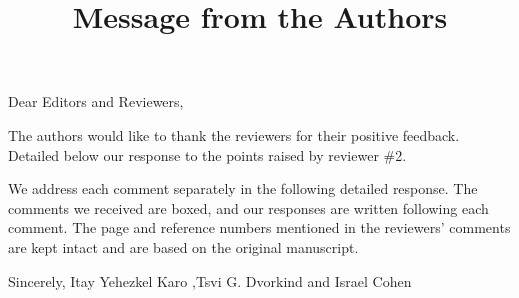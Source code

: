 \title{Message from the Authors}
\vskip 0.2in

\noindent Dear Editors and Reviewers,

\vskip 0.1in

\noindent The authors would like to thank the reviewers for their positive feedback. Detailed below our response to the points raised by reviewer \#2.

\noindent We address each comment separately in the following detailed response. The comments we received are boxed, and our responses are written following each comment. The page and reference numbers mentioned in the reviewers' comments are kept intact and are based on the original manuscript.
\vskip 0.2in

\noindent Sincerely,
\noindent  Itay Yehezkel Karo ,Tsvi G. Dvorkind and Israel Cohen


